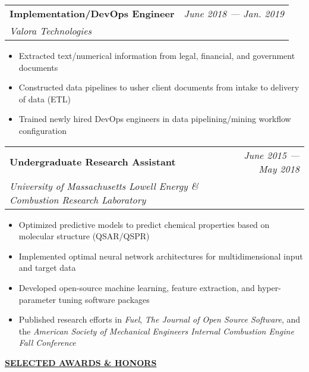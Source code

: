\documentclass{letter}
\begin{document}
    \begin{tabular*}{\linewidth}{L r}
        \textbf{Implementation/DevOps Engineer} & \textit{June 2018 --- Jan. 2019} \\
        \textit{Valora Technologies} & 
    \end{tabular*}

    \small
    \begin{itemize}[leftmargin=0.75cm]
        \setlength{\itemsep}{0pt}
        \item Extracted text/numerical information from legal, financial, and government documents
        \item Constructed data pipelines to usher client documents from intake to delivery of data (ETL)
        \item Trained newly hired DevOps engineers in data pipelining/mining workflow configuration
    \end{itemize}
    \normalsize

    \newpage

    \begin{tabular*}{\linewidth}{L r}
        \textbf{Undergraduate Research Assistant} & \textit{June 2015 --- May 2018} \\
        \textit{University of Massachusetts Lowell Energy \& Combustion Research Laboratory} & 
    \end{tabular*}

    \small
    \begin{itemize}[leftmargin=0.75cm]
        \setlength{\itemsep}{0pt}
        \item Optimized predictive models to predict chemical properties based on molecular structure (QSAR/QSPR)
        \item Implemented optimal neural network architectures for multidimensional input and target data
        \item Developed open-source machine learning, feature extraction, and hyper-parameter tuning software packages
        \item Published research efforts in \textit{Fuel}, \textit{The Journal of Open Source Software}, and the \textit{American Society of Mechanical Engineers Internal Combustion Engine Fall Conference}
    \end{itemize}
    \normalsize

    \medskip \large \textbf{\underline{SELECTED AWARDS \& HONORS}} \medskip \small
\end{document}
